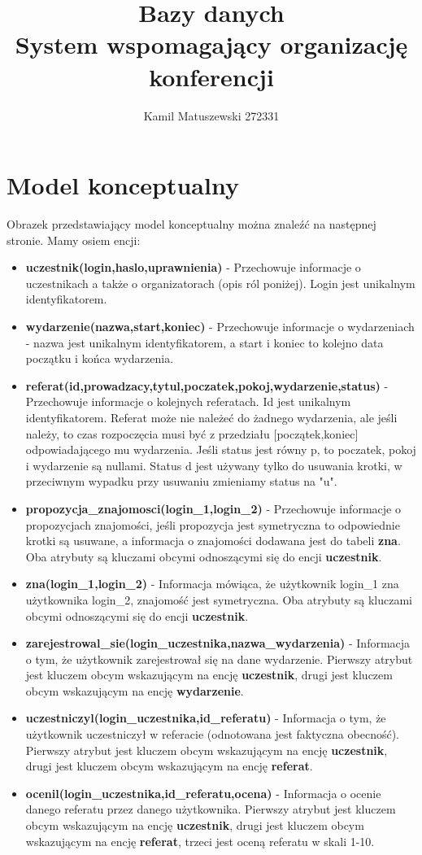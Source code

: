 \documentclass[a4paper]{article}
\author{Kamil Matuszewski 272331}
\title{\textbf{Bazy danych} \\ System wspomagający organizację konferencji}
\begin{document}
\maketitle

\section{Model konceptualny}
Obrazek przedstawiający model konceptualny można znaleźć na następnej stronie. Mamy osiem encji:
\begin{itemize}
\item \textbf{uczestnik(login,haslo,uprawnienia)} - Przechowuje informacje o uczestnikach a także o organizatorach (opis ról poniżej). Login jest unikalnym identyfikatorem.
\item \textbf{wydarzenie(nazwa,start,koniec)} - Przechowuje informacje o wydarzeniach - nazwa jest unikalnym identyfikatorem, a start i koniec to kolejno data początku i końca wydarzenia.
\item \textbf{referat(id,prowadzacy,tytul,poczatek,pokoj,wydarzenie,status)} - Przechowuje informacje o kolejnych referatach. Id jest unikalnym identyfikatorem. Referat może nie należeć do żadnego wydarzenia, ale jeśli należy, to czas rozpoczęcia musi być z przedziału [początek,koniec] odpowiadającego mu wydarzenia. Jeśli status jest równy p, to poczatek, pokoj i wydarzenie są nullami. Status d jest używany tylko do usuwania krotki, w przeciwnym wypadku przy usuwaniu zmieniamy status na "u".
\item \textbf{propozycja\_znajomosci(login\_1,login\_2)} - Przechowuje informacje o propozycjach znajomości, jeśli propozycja jest symetryczna to odpowiednie krotki są usuwane, a informacja o znajomości dodawana jest do tabeli \textbf{zna}. Oba atrybuty są kluczami obcymi odnoszącymi się do encji \textbf{uczestnik}.
\item \textbf{zna(login\_1,login\_2)} - Informacja mówiąca, że użytkownik login\_1 zna użytkownika login\_2, znajomość jest symetryczna. Oba atrybuty są kluczami obcymi odnoszącymi się do encji \textbf{uczestnik}.
\item \textbf{zarejestrowal\_sie(login\_uczestnika,nazwa\_wydarzenia)} - Informacja o tym, że użytkownik zarejestrował się na dane wydarzenie. Pierwszy atrybut jest kluczem obcym wskazującym na encję \textbf{uczestnik}, drugi jest kluczem obcym wskazującym na encję \textbf{wydarzenie}.
\item \textbf{uczestniczyl(login\_uczestnika,id\_referatu)} - Informacja o tym, że użytkownik uczestniczył w referacie (odnotowana jest faktyczna obecność). Pierwszy atrybut jest kluczem obcym wskazującym na encję \textbf{uczestnik}, drugi jest kluczem obcym wskazującym na encję \textbf{referat}.
\item \textbf{ocenil(login\_uczestnika,id\_referatu,ocena)} - Informacja o ocenie danego referatu przez danego użytkownika. Pierwszy atrybut jest kluczem obcym wskazującym na encję \textbf{uczestnik}, drugi jest kluczem obcym wskazującym na encję \textbf{referat}, trzeci jest oceną referatu w skali 1-10.

\end{itemize}
\end{document}
